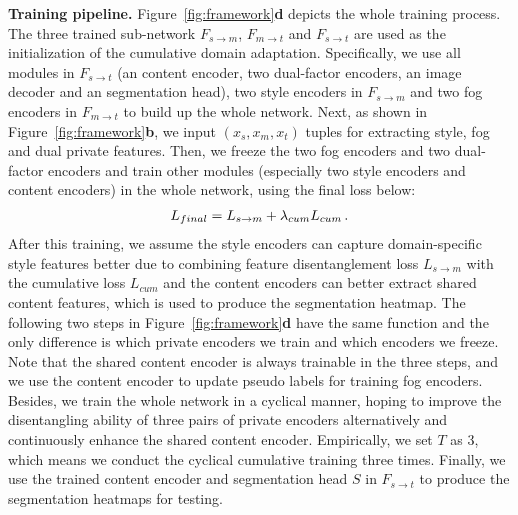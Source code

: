 \documentclass[10pt,twocolumn,letterpaper]{article}
\def\model{F}
\def\imd{m}
\def\td{t}
\newcommand{\heading}[1]{\noindent\textbf{#1}}
\begin{document}
\heading{Training pipeline.}
Figure~\ref{fig:framework}\textbf{d} depicts the whole training process.
The three trained sub-network $\model_{s \rightarrow \imd}$, $\model_{\imd \rightarrow \td}$ and $\model_{s \rightarrow \td}$ are used as the initialization of the cumulative domain adaptation. Specifically, we use all modules in $\model_{s \rightarrow \td}$ (an content encoder, two dual-factor encoders, an image decoder and an segmentation head), two style encoders in $\model_{s \rightarrow \imd}$ and two fog encoders in $\model_{\imd \rightarrow \td}$ to build up the whole network. Next, as shown in Figure~\ref{fig:framework}\textbf{b}, we input $(x_s, x_\imd, x_\td)$ tuples for extracting style, fog and dual private features. Then, we freeze the two fog encoders and two dual-factor encoders and train other modules (especially two style encoders and content encoders) in the whole network, using the final loss below: 
\vspace{-2mm}
\begin{equation} 
\vspace{-2mm}
\begin{split}
{L}_{final} =  {L}_{s \rightarrow \imd} +  \lambda_{cum}{L}_{cum} \,.
\end{split}
\label{equa:stage2_loss}
\vspace{-4mm}
\end{equation}
After this training, we assume the style encoders can capture domain-specific style features better due to combining feature disentanglement loss ${L}_{s \rightarrow \imd}$ with the cumulative loss ${L}_{cum}$ and the content encoders can better extract shared content features, which is used to produce the segmentation heatmap. 
The following two steps in Figure~\ref{fig:framework}\textbf{d} have the same function and the only difference is which private encoders we train and which encoders we freeze. Note that the shared content encoder is always trainable in the three steps, and we use the content encoder to update pseudo labels for training fog encoders. Besides, we train the whole network in a cyclical manner, hoping to improve the disentangling ability of three pairs of private encoders alternatively and continuously enhance the shared content encoder. Empirically, we set $T$ as 3, which means we conduct the cyclical cumulative training three times. Finally, we use the trained content encoder and segmentation head $S$ in $\model_{s \rightarrow \td}$ to produce the segmentation heatmaps for testing.
\end{document}
